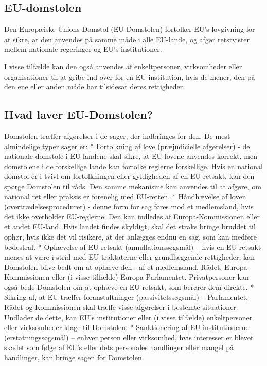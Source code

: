\documentclass[]{book}
\begin{document}
\hypertarget{eu-domstolen}{%
\subsection{EU-domstolen}\label{eu-domstolen}}

Den Europæiske Unions Domstol (EU-Domstolen) fortolker EU's lovgivning for at sikre, at den anvendes på samme måde i alle EU-lande, og afgør retstvister mellem nationale regeringer og EU's institutioner.

I visse tilfælde kan den også anvendes af enkeltpersoner, virksomheder eller organisationer til at gribe ind over for en EU-institution, hvis de mener, den på den ene eller anden måde har tilsidesat deres rettigheder.

\hypertarget{hvad-laver-eu-domstolen}{%
\subsection{Hvad laver EU-Domstolen?}\label{hvad-laver-eu-domstolen}}

Domstolen træffer afgørelser i de sager, der indbringes for den. De mest almindelige typer sager er:
* Fortolkning af love (præjudicielle afgørelser) - de nationale domstole i EU-landene skal sikre, at EU-lovene anvendes korrekt, men domstolene i de forskellige lande kan fortolke reglerne forskellige. Hvis en national domstol er i tvivl om fortolkningen eller gyldigheden af en EU-retsakt, kan den spørge Domstolen til råds. Den samme mekanisme kan anvendes til at afgøre, om national ret eller praksis er forenelig med EU-retten.
* Håndhævelse af loven (overtrædelsesprocedurer) - denne form for sag føres mod et medlemsland, hvis det ikke overholder EU-reglerne. Den kan indledes af Europa-Kommissionen eller et andet EU-land. Hvis landet findes skyldigt, skal det straks bringe bruddet til ophør, hvis ikke det vil risikere, at der anlægges endnu en sag, som kan medføre bødestraf.
* Ophævelse af EU-retsakt (annullationssøgsmål) -- hvis en EU-retsakt menes at være i strid med EU-traktaterne eller grundlæggende rettigheder, kan Domstolen blive bedt om at ophæve den - af et medlemsland, Rådet, Europa-Kommissionen eller (i visse tilfælde) Europa-Parlamentet.
Privatpersoner kan også bede Domstolen om at ophæve en EU-retsakt, som berører dem direkte.
* Sikring af, at EU træffer foranstaltninger (passivitetssøgsmål) -- Parlamentet, Rådet og Kommissionen skal træffe visse afgørelser i bestemte situationer. Undlader de dette, kan EU's institutioner eller (i visse tilfælde) enkeltpersoner eller virksomheder klage til Domstolen.
* Sanktionering af EU-institutionerne (erstatningssøgsmål) -- enhver person eller virksomhed, hvis interesser er blevet skadet som følge af EU's eller dets personales handlinger eller mangel på handlinger, kan bringe sagen for Domstolen.
\end{document}
